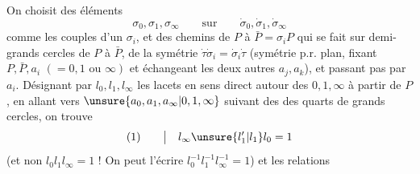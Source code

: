 On choisit des éléments
\[
\sigma_0,\sigma_1,\sigma_\infty\qquad\text{sur}\qquad\dot\sigma_0,\dot\sigma_1,\dot\sigma_\infty
\]
comme les couples d'un $\sigma_i$, et des chemins  de $P$ à $\bar P=\sigma_iP$ qui se fait sur   demi-grands cercles de $P$ à $\bar P$,    de la symétrie $\dot\tau\dot\sigma_i=\dot\sigma_i\dot\tau$ (symétrie p.r.  plan, fixant $P,\bar P,a_i$ $(=0,1\text{ ou }\infty)$ et échangeant les deux autres $a_j,a_k$), et  passant pas par $a_i$.  Désignant par $l_0,l_1,l_\infty$  les lacets en sens direct autour des $0,1,\infty$ à partir de $P$, en allant vers $\unsure{a_0,a_1,a_\infty|0,1,\infty}$ suivant des des quarts de grands cercles, on trouve
\[
(1)\qquad\big|\quad l_\infty\unsure{l'_1|l_1}l_0=1
\]
(et non $l_0l_1l_\infty=1$ !  On peut l'écrire $l_0^{-1}l_1^{-1}l_\infty^{-1}=1$)
et les relations

